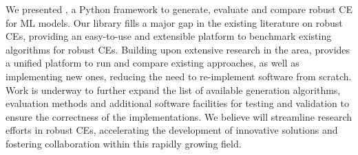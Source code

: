 We presented \name{}, a Python framework to generate, evaluate and compare robust CE for ML models. Our library fills a major gap in the existing literature on robust CEs, providing an easy-to-use and extensible platform to benchmark existing algorithms for robust CEs. Building upon extensive research in the area, \name{} provides a unified platform to run and compare existing approaches, as well as implementing new ones, reducing the need to re-implement software from scratch. Work is underway to further expand the list of available generation algorithms, evaluation methods and additional software facilities for testing and validation to ensure the correctness of the implementations. We believe \name{} will streamline research efforts in robust CEs, accelerating the development of innovative solutions and fostering collaboration within this rapidly growing field.